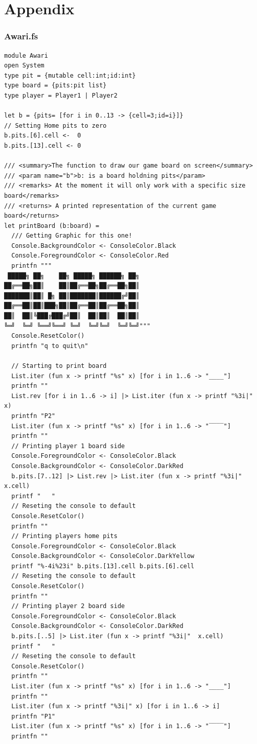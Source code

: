 \documentclass{article}
\begin{document}
\section*{Appendix}
\subsubsection{Awari.fs}
\lstset{language=FSharp,numbers=left,stepnumber=1}
\begin{lstlisting}[frame=single]
module Awari
open System
type pit = {mutable cell:int;id:int}
type board = {pits:pit list}
type player = Player1 | Player2

let b = {pits= [for i in 0..13 -> {cell=3;id=i}]}
// Setting Home pits to zero
b.pits.[6].cell <-  0
b.pits.[13].cell <- 0

/// <summary>The function to draw our game board on screen</summary>
/// <param name="b">b: is a board holdning pits</param>
/// <remarks> At the moment it will only work with a specific size board</remarks>
/// <returns> A printed representation of the current game board</returns>
let printBoard (b:board) =
  /// Getting Graphic for this one!
  Console.BackgroundColor <- ConsoleColor.Black
  Console.ForegroundColor <- ConsoleColor.Red
  printfn """  
 █████╗ ██╗    ██╗ █████╗ ██████╗ ██╗
██╔══██╗██║    ██║██╔══██╗██╔══██╗██║
███████║██║ █╗ ██║███████║██████╔╝██║
██╔══██║██║███╗██║██╔══██║██╔══██╗██║
██║  ██║╚███╔███╔╝██║  ██║██║  ██║██║
╚═╝  ╚═╝ ╚══╝╚══╝ ╚═╝  ╚═╝╚═╝  ╚═╝╚═╝"""
  Console.ResetColor()
  printfn "q to quit\n"
  
  // Starting to print board
  List.iter (fun x -> printf "%s" x) [for i in 1..6 -> "____"]
  printfn ""
  List.rev [for i in 1..6 -> i] |> List.iter (fun x -> printf "%3i|" x)
  printfn "P2"
  List.iter (fun x -> printf "%s" x) [for i in 1..6 -> "‾‾‾‾"]
  printfn ""
  // Printing player 1 board side
  Console.ForegroundColor <- ConsoleColor.Black
  Console.BackgroundColor <- ConsoleColor.DarkRed
  b.pits.[7..12] |> List.rev |> List.iter (fun x -> printf "%3i|" x.cell)
  printf "   "
  // Reseting the console to default
  Console.ResetColor()
  printfn ""
  // Printing players home pits
  Console.ForegroundColor <- ConsoleColor.Black
  Console.BackgroundColor <- ConsoleColor.DarkYellow
  printf "%-4i%23i" b.pits.[13].cell b.pits.[6].cell
  // Reseting the console to default
  Console.ResetColor()
  printfn ""
  // Printing player 2 board side
  Console.ForegroundColor <- ConsoleColor.Black
  Console.BackgroundColor <- ConsoleColor.DarkRed
  b.pits.[..5] |> List.iter (fun x -> printf "%3i|"  x.cell)
  printf "   "
  // Reseting the console to default
  Console.ResetColor()
  printfn ""
  List.iter (fun x -> printf "%s" x) [for i in 1..6 -> "____"]
  printfn ""
  List.iter (fun x -> printf "%3i|" x) [for i in 1..6 -> i]
  printfn "P1"
  List.iter (fun x -> printf "%s" x) [for i in 1..6 -> "‾‾‾‾"]
  printfn ""


\end{lstlisting}
\end{document}

